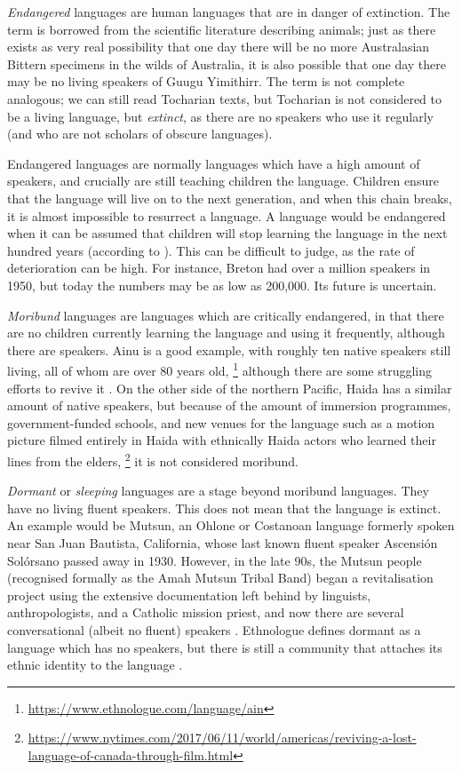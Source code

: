\emph{Endangered} languages are human languages that are in danger of extinction. The term is borrowed from the scientific literature describing animals; just as there exists as very real possibility that one day there will be no more Australasian Bittern specimens in the wilds of Australia, it is also possible that one day there may be no living speakers of Guugu Yimithirr. The term is not complete analogous; we can still read Tocharian texts, but Tocharian is not considered to be a living language, but \textit{extinct}, as there are no speakers who use it regularly (and who are not scholars of obscure languages).

Endangered languages are normally languages which have a high amount of speakers, and crucially are still teaching children the language. Children ensure that the language will live on to the next generation, and when this chain breaks, it is almost impossible to resurrect a language. A language would be endangered when it can be assumed that children will stop learning the language in the next hundred years (according to \citet{krauss92}). This can be difficult to judge, as the rate of deterioration can be high. For instance, Breton had over a million speakers in 1950, but today the numbers may be as low as 200,000. Its future is uncertain.

\emph{Moribund} languages are languages which are critically endangered, in that there are no children currently learning the language and using it frequently, although there are speakers. Ainu is a good example, with roughly ten native speakers still living, all of whom are over 80 years old, \footnote{\href{https://www.ethnologue.com/language/ain}{https://www.ethnologue.com/language/ain}} although there are some struggling efforts to revive it \citep{hanks2017policy}. On the other side of the northern Pacific, Haida has a similar amount of native speakers, but because of the amount of immersion programmes, government-funded schools, and new venues for the language such as a motion picture filmed entirely in Haida with ethnically Haida actors who learned their lines from the elders, \footnote{\href{https://www.nytimes.com/2017/06/11/world/americas/reviving-a-lost-language-of-canada-through-film.html}{https://www.nytimes.com/2017/06/11/world/americas/reviving-a-lost-language-of-canada-through-film.html}} it is not considered moribund.

\emph{Dormant} or \textit{sleeping} languages are a stage beyond moribund languages. They have no living fluent speakers. This does not mean that the language is extinct. An example would be Mutsun, an Ohlone or Costanoan language formerly spoken near San Juan Bautista, California, whose last known fluent speaker Ascensi\'on Sol\'orsano passed away in 1930. However, in the late 90s, the Mutsun people (recognised formally as the Amah Mutsun Tribal Band) began a revitalisation project using the extensive documentation left behind by linguists, anthropologists, and a Catholic mission priest, and now there are several conversational (albeit no fluent) speakers \citep{warner2007ethics}. Ethnologue defines dormant as a language which has no speakers, but there is still a community that attaches its ethnic identity to the language \citep{lewis2010assessing}.

